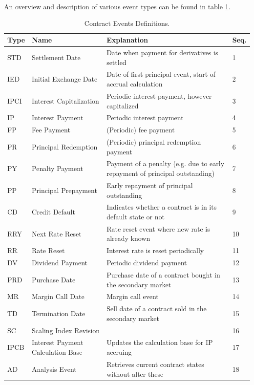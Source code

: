 \documentclass[9pt,oneside]{amsart}
\begin{document}
\begin{multicols}{2}
An overview and description of various event types can be found in table \ref{tbl:events}. 




\begin{table}[H]
	\begin{tabular}{| p{0.23in}p{0.7in}p{1.4in}p{0.2in} |}
	\hline
	\textbf{Type} & \textbf{Name} & \textbf{Explanation} & \textbf{Seq.} \\
	\hline
	STD & Settlement Date & Date when payment for derivatives is settled & 1 \\
	\hline
	IED & Initial Exchange Date & Date of first principal event, start of accrual calculation & 2 \\
	\hline
	IPCI & Interest Capitalization & Periodic interest payment, however capitalized & 3 \\
	\hline
	IP & Interest Payment & Periodic interest payment & 4 \\
	\hline
	FP & Fee Payment & (Periodic) fee payment & 5 \\
	\hline
	PR & Principal Redemption & (Periodic) principal redemption payment & 6 \\
	\hline
	PY & Penalty Payment & Payment of a penalty (e.g. due to early repayment of principal outstanding) & 7 \\
	\hline
	PP & Principal Prepayment & Early repayment of principal outstanding & 8 \\
	\hline
	CD & Credit Default & Indicates whether a contract is in its default state or not & 9 \\
	\hline
	RRY & Next Rate Reset & Rate reset event where new rate is already known & 10 \\
	\hline
	RR & Rate Reset & Interest rate is reset periodically & 11 \\
	\hline
	DV & Dividend Payment & Periodic dividend payment & 12 \\
	\hline
	PRD & Purchase Date & Purchase date of a contract bought in the secondary market & 13 \\
	\hline
	MR & Margin Call Date & Margin call event & 14 \\
	\hline
	TD & Termination Date & Sell date of a contract sold in the secondary market & 15 \\
	\hline
	SC & Scaling Index Revision & & 16 \\
	\hline
	IPCB & Interest Payment Calculation Base & Updates the calculation base for IP accruing & 17 \\
	\hline
	AD & Analysis Event & Retrieves current contract states without alter these & 18 \\
	\hline
	\end{tabular}
	\caption{Contract Events Definitions.}
	\label{tbl:events}
\end{table}



\end{multicols}
\end{document}
